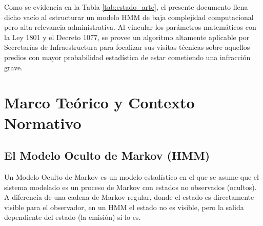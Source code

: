 \documentclass[12pt,letterpaper]{article}
\begin{document}
\begin{table}[H]
\centering
\caption{Tabla Comparativa de Trabajos Previos Relevantes}
\label{tab:estado_arte}
\end{table}

Como se evidencia en la Tabla \ref{tab:estado_arte}, el presente documento llena dicho vacío al estructurar un modelo HMM de baja complejidad computacional pero alta relevancia administrativa. Al vincular los parámetros matemáticos con la Ley 1801 y el Decreto 1077, se provee un algoritmo altamente aplicable por Secretarías de Infraestructura para focalizar sus visitas técnicas sobre aquellos predios con mayor probabilidad estadística de estar cometiendo una infracción grave.

\section{Marco Teórico y Contexto Normativo}

\subsection{El Modelo Oculto de Markov (HMM)}
Un Modelo Oculto de Markov es un modelo estadístico en el que se asume que el sistema modelado es un proceso de Markov con estados no observados (ocultos). A diferencia de una cadena de Markov regular, donde el estado es directamente visible para el observador, en un HMM el estado no es visible, pero la salida dependiente del estado (la emisión) sí lo es.
\end{document}
